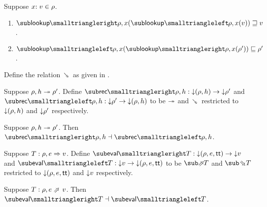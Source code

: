 \begin{lemma}
\label{lem:core-language:env-get-put}Suppose $x{:}\;v\in{\rho}$.
\begin{enumerate}
   \item \label{lem:core-language:env-get-put:1} $\envLookupFwdF{\rho,x}(\envLookupBwdF{\rho,x}(v)) \geq v$.
   \item \label{lem:core-language:env-get-put:2} $\envLookupBwdF{\rho,x}(\envLookupFwdF{\rho,x}(\rho')) \leq \rho'$.
\end{enumerate}
\end{lemma}

\begin{definition}
   \label{def:core-language:closeDefs-bwd}
   Define the relation $\closeDefsBwdR$ as given in .
\end{definition}

\begin{definition}
   Suppose $\rho, h \twoheadrightarrow \rho'$. Define $\closeDefsFwdF{\rho,h}: \Below{(\rho, h)} \to \Below{\rho'}$ and $\closeDefsBwdF{\rho,h}: \Below{\rho'} \to \Below{(\rho, h)}$ to be $\twoheadrightarrow$ and $\closeDefsBwdR$ restricted to ${\downarrow}{(\rho, h)}$ and ${\downarrow}{\rho'}$ respectively.
\end{definition}

\begin{theorem}
\label{thm:core-language:closeDefs:gc}
   Suppose $\rho, h \twoheadrightarrow \rho'$.  Then $\closeDefsFwdF{\rho,h} \adjoint \closeDefsBwdF{\rho,h}$.
\end{theorem}

\begin{definition}
   Suppose $T: \rho, e \Rightarrow v$. Define $\evalFwdF{T}: \Below{(\rho, e, \TT)} \to \Below{v}$ and $\evalBwdF{T}: \Below{v} \to \Below{(\rho, e, \TT)}$ to be $\evalFwdR{T}$ and $\evalBwdR{T}$ restricted to ${\downarrow}{(\rho, e, \mathsf{tt})}$ and ${\downarrow}{v}$ respectively.
\end{definition}

\begin{theorem}
\label{thm:core-language:eval:gc}
   Suppose $T: \rho, e \evalFwdS v$.  Then $\evalFwdF{T} \adjoint \evalBwdF{T}$.
\end{theorem}
